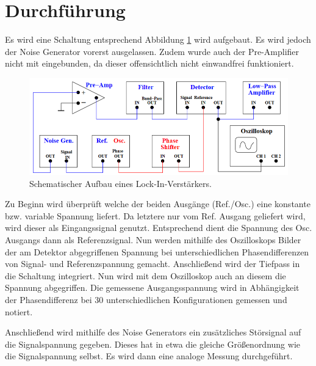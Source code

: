\section{Durchführung}
\label{sec:Durchführung}

Es wird eine Schaltung entsprechend Abbildung \ref{fig:Schaltung1} wird aufgebaut.
Es wird jedoch der Noise Generator vorerst ausgelassen. Zudem wurde auch der Pre-Amplifier
nicht mit eingebunden, da dieser offensichtlich nicht einwandfrei funktioniert.
\begin{figure}[H]
  \centering
  \includegraphics[width=14cm]{Schaltung1.PNG}
  \caption{Schematischer Aufbau eines Lock-In-Verstärkers. \cite{sample}}
  \label{fig:Schaltung1}
\end{figure}

Zu Beginn wird überprüft welche der beiden Ausgänge (Ref./Osc.) eine konstante bzw.
variable Spannung liefert. Da letztere nur vom Ref. Ausgang geliefert wird, wird
dieser als Eingangssignal genutzt. Entsprechend dient die Spannung des Osc. Ausgangs
dann als Referenzsignal.
Nun werden mithilfe des Oszilloskops Bilder der am Detektor abgegriffenen Spannung
bei unterschiedlichen Phasendifferenzen von Signal- und Referenzspannung gemacht.
Anschließend wird der Tiefpass in die Schaltung integriert. Nun wird mit dem Oszilloskop
auch an diesem die Spannung abgegriffen. Die gemessene Ausgangsspannung wird in
Abhängigkeit der Phasendifferenz bei 30 unterschiedlichen Konfigurationen gemessen und notiert.

Anschließend wird mithilfe des Noise Generators ein zusätzliches Störsignal auf die
Signalspannung gegeben. Dieses hat in etwa die gleiche Größenordnung wie die
Signalspannung selbst. Es wird dann eine analoge Messung durchgeführt.

